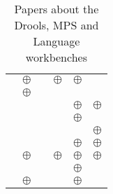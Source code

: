 \begin{table}[H]
\begin{tabular}{l || c | c | c | c | c}
        \cite{voelter2014generic}        & $\oplus$ &          & $\oplus$ & $\oplus$ &          \\
        \cite{voelter2013dsl}            & $\oplus$ &          &          &          &          \\
        \cite{voelter2019lessons}        &          &          &          & $\oplus$ & $\oplus$ \\
        \cite{voelter2019shadow}         &          &          &          & $\oplus$ &          \\
        \cite{voelter2014towards}        &          &          &          &          & $\oplus$ \\
        \cite{voelter2015using}          &          &          &          & $\oplus$ & $\oplus$ \\
        \cite{voelter2019using}          & $\oplus$ &          & $\oplus$ & $\oplus$ & $\oplus$ \\
        \cite{vysoky2016grammar}         &          &          &          & $\oplus$ &          \\
        \cite{wortmann2016domain}        & $\oplus$ &          &          & $\oplus$ &          \\
    \end{tabular}
	\caption{Papers about the Drools, MPS and Language workbenches}
    \label{table:literature_review}
\end{table}

